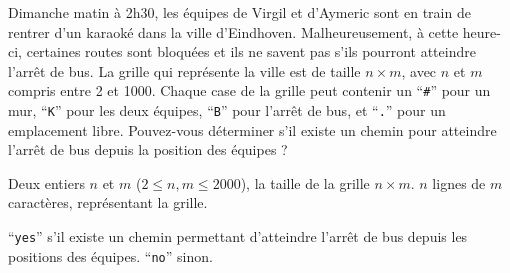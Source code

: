 \problemname{\problemyamlname}


Dimanche matin à 2h30, les équipes de Virgil et d'Aymeric sont en train de rentrer d'un karaoké dans la ville d'Eindhoven.
Malheureusement, à cette heure-ci, certaines routes sont bloquées et ils ne savent pas s'ils pourront atteindre l'arrêt de bus. 
La grille qui représente la ville est de taille $n \times m$, avec $n$ et $m$ compris entre 2 et 1000.
Chaque case de la grille peut contenir un ``\verb|#|'' pour un mur, ``\verb|K|'' pour les deux équipes, ``\verb|B|'' pour l'arrêt de bus, et ``\verb|.|'' pour un emplacement libre.
Pouvez-vous déterminer s'il existe un chemin pour atteindre l'arrêt de bus depuis la position des équipes ?

\begin{Input}
	Deux entiers $n$ et $m$ ($2 \le n, m \le 2000$), la taille de la grille $n \times m$.
	$n$ lignes de $m$ caractères, représentant la grille.
\end{Input}

\begin{Output}
	``\verb|yes|'' s'il existe un chemin permettant d'atteindre l'arrêt de bus depuis les positions des équipes.
	``\verb|no|'' sinon.
\end{Output}
